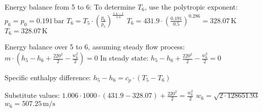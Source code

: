 Energy balance from 5 to 6:  
To determine \( T_6 \), use the polytropic exponent:  
\( p_6 = p_0 = 0.191 \, \text{bar} \)  
\( T_6 = T_5 \cdot \left( \frac{p_6}{p_5} \right)^{\frac{1.4 - 1}{1.4}} \)  
\( T_6 = 431.9 \cdot \left( \frac{0.191}{0.5} \right)^{0.286} = 328.07 \, \text{K} \)  
\( T_6 = 328.07 \, \text{K} \)  

Energy balance over 5 to 6, assuming steady flow process:  
\( m \cdot \left( h_5 - h_6 + \frac{220^2}{2} - \frac{w_6^2}{2} \right) = 0 \)  
In steady state:  
\( h_5 - h_6 + \frac{220^2}{2} - \frac{w_6^2}{2} = 0 \)  

Specific enthalpy difference:  
\( h_5 - h_6 = c_p \cdot (T_5 - T_6) \)  

Substitute values:  
\( 1.006 \cdot 1000 \cdot (431.9 - 328.07) + \frac{220^2}{2} = \frac{w_6^2}{2} \)  
\( w_6 = \sqrt{2 \cdot 128651.93} \)  
\( w_6 = 507.25 \, \text{m/s} \)